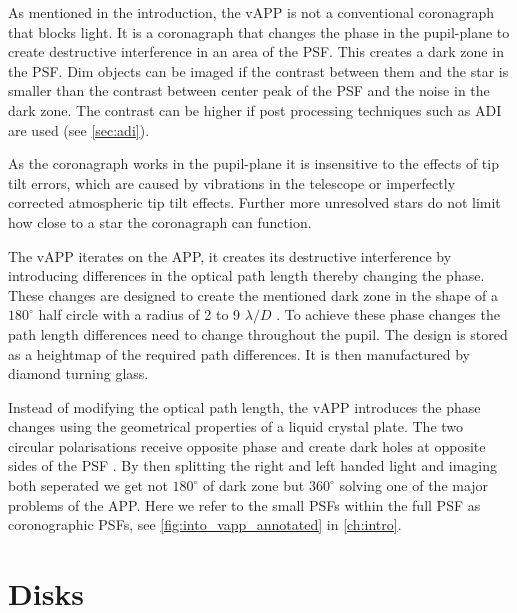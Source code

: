 As mentioned in the introduction, the \ac{vAPP} is not a conventional coronagraph that blocks light. It is a coronagraph that changes the phase in the pupil-plane to create destructive interference in an area of the \ac{PSF}. This creates a dark zone in the \ac{PSF}. Dim objects can be imaged if the contrast between them and the star is smaller than the contrast between center peak of the \ac{PSF} and the noise in the dark zone. The contrast can be higher if post processing techniques such as \ac*{ADI} are used (see \autoref{sec:adi}).

As the coronagraph works in the pupil-plane it is insensitive to the effects of tip tilt errors, which are caused by vibrations in the telescope or imperfectly corrected atmospheric tip tilt effects. Further more unresolved stars do not limit how close to a star the coronagraph can function.

The \ac{vAPP} iterates on the \ac{APP}, it creates its destructive interference by introducing differences in the optical path length thereby changing the phase. These changes are designed to create the mentioned dark zone in the shape of a $180^\circ$ half circle with a radius of 2 to 9 $\lambda/D$ \cite{vapp_doelman}. To achieve these phase changes the path length differences need to change throughout the pupil. The design is stored as a heightmap of the required path differences. It is then manufactured by diamond turning glass. 

Instead of modifying the optical path length, the \ac{vAPP} introduces the phase changes using the geometrical properties of a liquid crystal plate. The two circular polarisations receive opposite phase and create dark holes at opposite sides of the \ac{PSF} \cite{vapp_snik} \cite{vapp_otten} \cite{vapp_doelman}. By then splitting the right and left handed light and imaging both seperated we get not $180^\circ$ of dark zone but $360^\circ$ solving one of the major problems of the \ac{APP}. Here we refer to the small \acp{PSF} within the full \ac{PSF} as coronographic \acp{PSF}, see \autoref{fig:into_vapp_annotated} in \autoref{ch:intro}.






\section{Disks} %
\label{sec:disks} %


